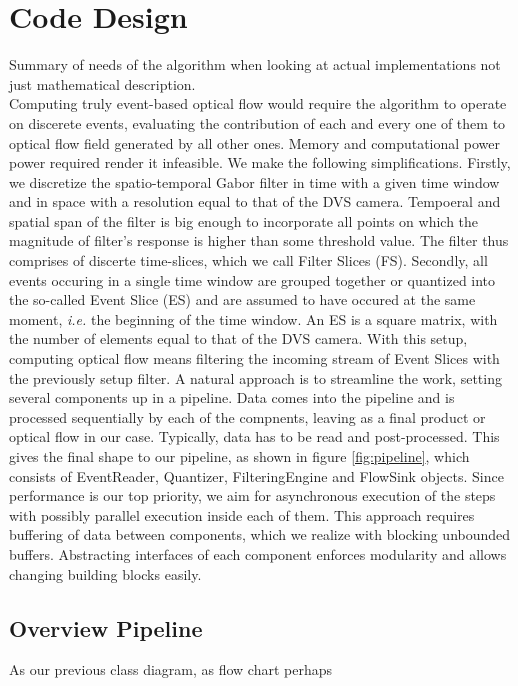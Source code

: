\section{Code Design}
Summary of needs of the algorithm when looking at actual implementations not just mathematical description.
\vspace*{2cm} \\ 

Computing truly event-based optical flow would require the algorithm to operate on discerete events, evaluating the contribution of each and every one of them to optical flow field generated by all other ones.
Memory and computational power power required render it infeasible.
We make the following simplifications.
Firstly, we discretize the spatio-temporal Gabor filter in time with a given time window and in space with a resolution equal to that of the DVS camera.
Tempoeral and spatial span of the filter is big enough to incorporate all points on which the magnitude of filter's response is higher than some threshold value.
The filter thus comprises of discerte time-slices, which we call Filter Slices (FS).
Secondly, all events occuring in a single time window are grouped together or quantized into the so-called Event Slice (ES) and are assumed to have occured at the same moment, \emph{i.e.} the beginning of the time window. 
An ES is a square matrix, with the number of elements equal to that of the DVS camera. 
With this setup, computing optical flow means filtering the incoming stream of Event Slices with the previously setup filter.
A natural approach is to streamline the work, setting several components up in a pipeline.
Data comes into the pipeline and is processed sequentially by each of the compnents, leaving as a final product or optical flow in our case. 
Typically, data has to be read and post-processed.
This gives the final shape to our pipeline, as shown in figure \ref{fig:pipeline}, which consists of EventReader, Quantizer, FilteringEngine and FlowSink objects.
Since performance is our top priority, we aim for asynchronous execution of the steps with possibly parallel execution inside each of them.
This approach requires buffering of data between components, which we realize with blocking unbounded buffers. 
Abstracting interfaces of each component enforces modularity and allows changing building blocks easily.

\subsection{Overview Pipeline}
As our previous class diagram, as flow chart perhaps
\vspace*{2cm} \\ 

